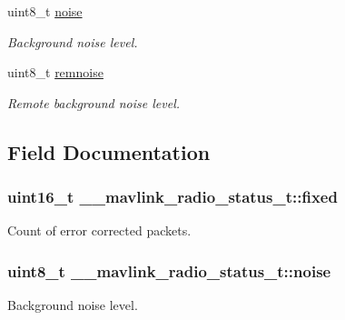 \begin{DoxyCompactItemize}
uint8\+\_\+t \hyperlink{struct____mavlink__radio__status__t_adfe004fd757a44f0b4cdb6c15c9a1bde}{noise}
\begin{DoxyCompactList}\small\item\em Background noise level. \end{DoxyCompactList}\item 
uint8\+\_\+t \hyperlink{struct____mavlink__radio__status__t_a8c72fbe2cc42a71933ed93aa3064f2f4}{remnoise}
\begin{DoxyCompactList}\small\item\em Remote background noise level. \end{DoxyCompactList}\end{DoxyCompactItemize}


\subsection{Field Documentation}
\hypertarget{struct____mavlink__radio__status__t_a7963729a484bb7268e6723a0076020c1}{
\subsubsection[{fixed}]{\setlength{\rightskip}{0pt plus 5cm}uint16\+\_\+t \+\_\+\+\_\+mavlink\+\_\+radio\+\_\+status\+\_\+t\+::fixed}}\label{struct____mavlink__radio__status__t_a7963729a484bb7268e6723a0076020c1}


Count of error corrected packets. 

\hypertarget{struct____mavlink__radio__status__t_adfe004fd757a44f0b4cdb6c15c9a1bde}{
\subsubsection[{noise}]{\setlength{\rightskip}{0pt plus 5cm}uint8\+\_\+t \+\_\+\+\_\+mavlink\+\_\+radio\+\_\+status\+\_\+t\+::noise}}\label{struct____mavlink__radio__status__t_adfe004fd757a44f0b4cdb6c15c9a1bde}


Background noise level. 

